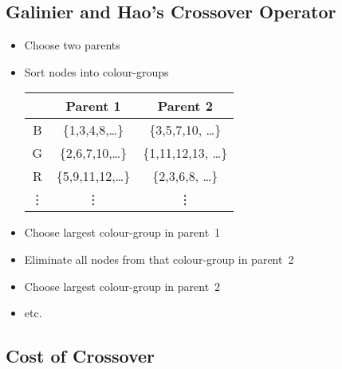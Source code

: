 \begin{slide}
\section[-1]{Galinier and Hao's Crossover Operator}

\begin{PauseHighLight}
  \begin{itemize}\squeeze
  \item Choose two parents\pause
  \item Sort nodes into colour-groups\pause
    \begin{center}
      \begin{tabular}{|c|c|c|} \hline
        & Parent 1 & Parent 2  \\ \hline
        B & \{1,3,4,8,\ldots\} & \{3,5,7,10, \ldots \} \\
        G & \{2,6,7,10,\ldots\} & \{1,11,12,13, \ldots \} \\
        R & \{5,9,11,12,\ldots\} & \{2,3,6,8, \ldots \} \\
        \vdots & \vdots & \vdots \\
        \hline
      \end{tabular}\pause
    \end{center}
  \item Choose largest colour-group in parent~1\pause
  \item Eliminate all nodes from that colour-group in parent~2\pause
  \item Choose largest colour-group in parent~2\pause
  \item etc.\pause
  \end{itemize}
\end{PauseHighLight}

\end{slide}

\begin{slide}
\section[-2]{Cost of Crossover}

\pb
\color{TextColor}
\begin{center}
  \pause
\end{center}

\end{slide}


